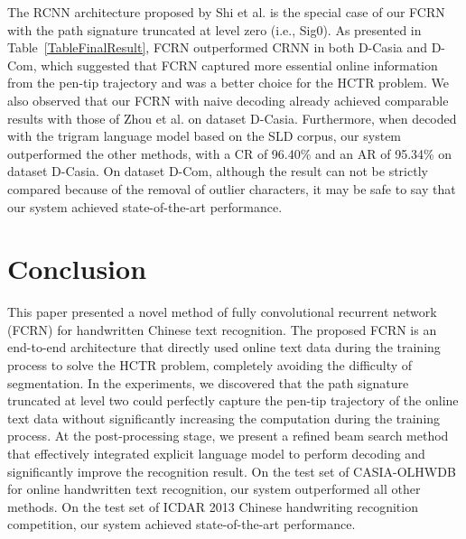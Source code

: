 \documentclass[10pt,conference,a4paper]{IEEEtran}
\begin{document}
The RCNN architecture proposed by Shi et al.\cite{shi2015end} is the special case of our FCRN with the path signature truncated at level zero (i.e., Sig0).
As presented in Table~\ref{TableFinalResult}, FCRN outperformed CRNN in both D-Casia and D-Com, which suggested that FCRN captured more essential online information from the pen-tip trajectory and was a better choice for the HCTR problem.
We also observed that our FCRN with naive decoding already achieved comparable results with those of Zhou et al.\cite{zhou2013handwritten}\cite{zhou2014minimum} on dataset D-Casia.
Furthermore, when decoded with the trigram language model based on the SLD corpus, our system outperformed the other methods, with a CR of 96.40\% and an AR of 95.34\% on dataset D-Casia.
On dataset D-Com, although the result can not be strictly compared because of the removal of outlier characters, it may be safe to say that our system achieved state-of-the-art performance.

\section{Conclusion}
This paper presented a novel method of fully convolutional recurrent network (FCRN) for handwritten Chinese text recognition.
The proposed FCRN is an end-to-end architecture that directly used online text data during the training process to solve the HCTR problem, completely avoiding the difficulty of segmentation.
In the experiments, we discovered that the path signature truncated at level two could perfectly capture the pen-tip trajectory of the online text data without significantly increasing the computation during the training process.
At the post-processing stage, we present a refined beam search method that effectively integrated explicit language model to perform decoding and significantly improve the recognition result.
On the test set of CASIA-OLHWDB for online handwritten text recognition, our system outperformed all other methods.
On the test set of ICDAR 2013 Chinese handwriting recognition competition, our system achieved state-of-the-art performance.



\end{document}
